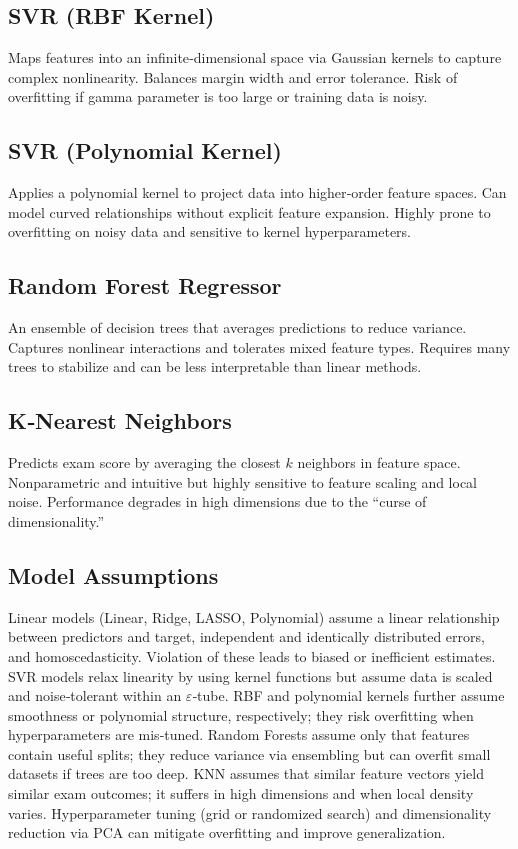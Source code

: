 \documentclass[conference]{IEEEtran}
\begin{document}
\subsection{SVR (RBF Kernel)}
Maps features into an infinite‐dimensional space via Gaussian kernels to capture complex nonlinearity. Balances margin width and error tolerance. Risk of overfitting if gamma parameter is too large or training data is noisy.

\subsection{SVR (Polynomial Kernel)}
Applies a polynomial kernel to project data into higher‐order feature spaces. Can model curved relationships without explicit feature expansion. Highly prone to overfitting on noisy data and sensitive to kernel hyperparameters.

\subsection{Random Forest Regressor}
An ensemble of decision trees that averages predictions to reduce variance. Captures nonlinear interactions and tolerates mixed feature types. Requires many trees to stabilize and can be less interpretable than linear methods.

\subsection{K‐Nearest Neighbors}
Predicts exam score by averaging the closest $k$ neighbors in feature space. Nonparametric and intuitive but highly sensitive to feature scaling and local noise. Performance degrades in high dimensions due to the “curse of dimensionality.”

\subsection{Model Assumptions}
Linear models (Linear, Ridge, LASSO, Polynomial) assume a linear relationship between predictors and target, independent and identically distributed errors, and homoscedasticity. Violation of these leads to biased or inefficient estimates. SVR models relax linearity by using kernel functions but assume data is scaled and noise‐tolerant within an $\varepsilon$‐tube. RBF and polynomial kernels further assume smoothness or polynomial structure, respectively; they risk overfitting when hyperparameters are mis‐tuned. Random Forests assume only that features contain useful splits; they reduce variance via ensembling but can overfit small datasets if trees are too deep. KNN assumes that similar feature vectors yield similar exam outcomes; it suffers in high dimensions and when local density varies. Hyperparameter tuning (grid or randomized search) and dimensionality reduction via PCA can mitigate overfitting and improve generalization.
\end{document}
